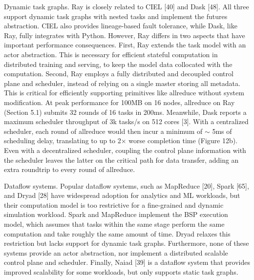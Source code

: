 \documentclass[
]{article}
\newcounter{none} %
\begin{document}
Dynamic task graphs. Ray is closely related to CIEL {[}40{]} and Dask
{[}48{]}. All three support dynamic task graphs with nested tasks and
implement the futures abstraction. CIEL also provides lineage-based
fault tolerance, while Dask, like Ray, fully integrates with Python.
However, Ray differs in two aspects that have important performance
consequences. First, Ray extends the task model with an actor
abstraction. This is necessary for efficient stateful computation in
distributed training and serving, to keep the model data collocated with
the computation. Second, Ray employs a fully distributed and decoupled
control plane and scheduler, instead of relying on a single master
storing all metadata. This is critical for efficiently supporting
primitives like allreduce without system modification. At peak
performance for 100MB on 16 nodes, allreduce on Ray (Section 5.1)
submits 32 rounds of 16 tasks in 200ms. Meanwhile, Dask reports a
maximum scheduler throughput of 3k tasks/s on 512 cores {[}3{]}. With a
centralized scheduler, each round of allreduce would then incur a
minimum of \(\sim\) 5ms of scheduling delay, translating to up to 2×
worse completion time (Figure 12b). Even with a decentralized scheduler,
coupling the control plane information with the scheduler leaves the
latter on the critical path for data transfer, adding an extra roundtrip
to every round of allreduce.

Dataflow systems. Popular dataflow systems, such as MapReduce {[}20{]},
Spark {[}65{]}, and Dryad {[}28{]} have widespread adoption for
analytics and ML workloads, but their computation model is too
restrictive for a fine-grained and dynamic simulation workload. Spark
and MapReduce implement the BSP execution model, which assumes that
tasks within the same stage perform the same computation and take
roughly the same amount of time. Dryad relaxes this restriction but
lacks support for dynamic task graphs. Furthermore, none of these
systems provide an actor abstraction, nor implement a distributed
scalable control plane and scheduler. Finally, Naiad {[}39{]} is a
dataflow system that provides improved scalability for some workloads,
but only supports static task graphs.
\end{document}
